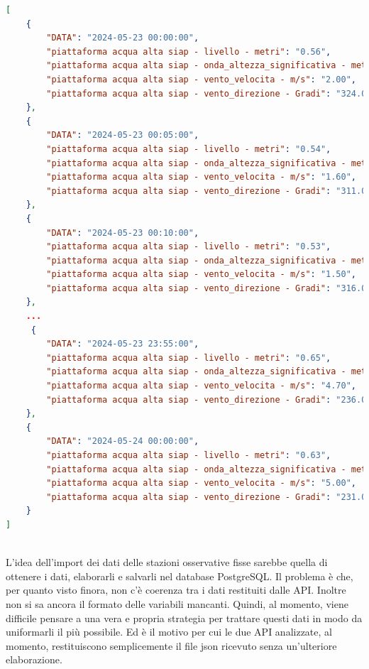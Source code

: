 \documentclass[./main.tex]{subfiles}
\begin{document}
\begin{lstlisting}[language=json, 
    caption={Porzione delle misurazioni di livello del mare, altezza d'onda, direzione e intensità del vento, effettuate nel periodo tra il 23 maggio e il 24 maggio 2024 dai sensori SIAP posti sulla piattaforma Acqua Alta. I dati vengono richiesti all'API del comune di Venezia.}, 
    label=lst:api_comuneVE]
[
    {
        "DATA": "2024-05-23 00:00:00",
        "piattaforma acqua alta siap - livello - metri": "0.56",
        "piattaforma acqua alta siap - onda_altezza_significativa - metri": "0.13",
        "piattaforma acqua alta siap - vento_velocita - m/s": "2.00",
        "piattaforma acqua alta siap - vento_direzione - Gradi": "324.00"
    },
    {
        "DATA": "2024-05-23 00:05:00",
        "piattaforma acqua alta siap - livello - metri": "0.54",
        "piattaforma acqua alta siap - onda_altezza_significativa - metri": null,
        "piattaforma acqua alta siap - vento_velocita - m/s": "1.60",
        "piattaforma acqua alta siap - vento_direzione - Gradi": "311.00"
    },
    {
        "DATA": "2024-05-23 00:10:00",
        "piattaforma acqua alta siap - livello - metri": "0.53",
        "piattaforma acqua alta siap - onda_altezza_significativa - metri": null,
        "piattaforma acqua alta siap - vento_velocita - m/s": "1.50",
        "piattaforma acqua alta siap - vento_direzione - Gradi": "316.00"
    },
    ...
     {
        "DATA": "2024-05-23 23:55:00",
        "piattaforma acqua alta siap - livello - metri": "0.65",
        "piattaforma acqua alta siap - onda_altezza_significativa - metri": null,
        "piattaforma acqua alta siap - vento_velocita - m/s": "4.70",
        "piattaforma acqua alta siap - vento_direzione - Gradi": "236.00"
    },
    {
        "DATA": "2024-05-24 00:00:00",
        "piattaforma acqua alta siap - livello - metri": "0.63",
        "piattaforma acqua alta siap - onda_altezza_significativa - metri": "0.19",
        "piattaforma acqua alta siap - vento_velocita - m/s": "5.00",
        "piattaforma acqua alta siap - vento_direzione - Gradi": "231.00"
    }
]
   
\end{lstlisting}


L'idea dell'import dei dati delle stazioni osservative fisse sarebbe quella di ottenere i dati, elaborarli e salvarli nel database PostgreSQL. Il problema è che, per quanto visto finora, non c'è coerenza tra i dati restituiti dalle API. Inoltre non si sa ancora il formato delle variabili mancanti. Quindi, al momento, viene difficile pensare a una vera e propria strategia per trattare questi dati in modo da uniformarli il più possibile. Ed è il motivo per cui le due API analizzate, al momento, restituiscono semplicemente il file json ricevuto senza un'ulteriore elaborazione.
\end{document}
